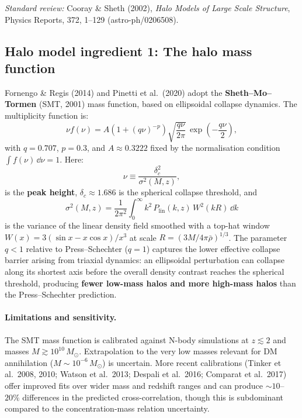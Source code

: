\documentclass[10pt,a4paper]{article}
\newcommand{\rhobar}{\bar{\rho}}
\newcommand{\Plin}{P_{\mathrm{lin}}}
\newcommand{\Msun}{M_\odot}
\begin{document}
\textit{Standard review:} Cooray \& Sheth (2002), \textit{Halo Models of Large Scale Structure}, Physics Reports, 372, 1--129 (astro-ph/0206508).

\subsection{Halo model ingredient 1: The halo mass function}
\label{sec:hmf}

Fornengo \& Regis (2014) and Pinetti et al.\ (2020) adopt the \textbf{Sheth--Mo--Tormen} (SMT, 2001) mass function, based on ellipsoidal collapse dynamics. The multiplicity function is:
\begin{equation}
\label{eq:SMT_mf}
\nu f(\nu) = A \left(1 + (q\nu)^{-p}\right) \sqrt{\frac{q\nu}{2\pi}} \, \exp\!\left(-\frac{q\nu}{2}\right),
\end{equation}
with $q = 0.707$, $p = 0.3$, and $A \approx 0.3222$ fixed by the normalisation condition $\int f(\nu) \, \dd\nu = 1$. Here:
\begin{equation}
\nu \equiv \frac{\delta_c^2}{\sigma^2(M, z)},
\end{equation}
is the \textbf{peak height}, $\delta_c \approx 1.686$ is the spherical collapse threshold, and
\begin{equation}
\sigma^2(M, z) = \frac{1}{2\pi^2} \int_0^\infty k^2 \, \Plin(k, z) \, W^2(kR) \, \dd k
\end{equation}
is the variance of the linear density field smoothed with a top-hat window $W(x) = 3(\sin x - x \cos x)/x^3$ at scale $R = (3M/4\pi\rhobar)^{1/3}$. The parameter $q < 1$ relative to Press--Schechter ($q = 1$) captures the lower effective collapse barrier arising from triaxial dynamics: an ellipsoidal perturbation can collapse along its shortest axis before the overall density contrast reaches the spherical threshold, producing \textbf{fewer low-mass halos and more high-mass halos} than the Press--Schechter prediction.

\paragraph{Limitations and sensitivity.} The SMT mass function is calibrated against N-body simulations at $z \lesssim 2$ and masses $M \gtrsim 10^{10} \, \Msun$. Extrapolation to the very low masses relevant for DM annihilation ($M \sim 10^{-6} \, \Msun$) is uncertain. More recent calibrations (Tinker et al.\ 2008, 2010; Watson et al.\ 2013; Despali et al.\ 2016; Comparat et al.\ 2017) offer improved fits over wider mass and redshift ranges and can produce $\sim 10$--$20\%$ differences in the predicted cross-correlation, though this is subdominant compared to the concentration-mass relation uncertainty.
\end{document}
